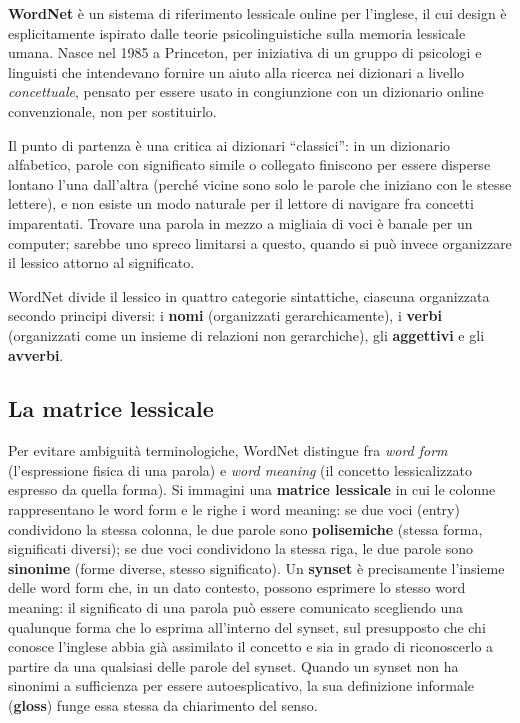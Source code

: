 \documentclass[11pt,a4paper]{report}
\begin{document}
\textbf{WordNet} è un sistema di riferimento lessicale online per l'inglese, il cui design è esplicitamente ispirato dalle teorie psicolinguistiche sulla memoria lessicale umana. Nasce nel 1985 a Princeton, per iniziativa di un gruppo di psicologi e linguisti che intendevano fornire un aiuto alla ricerca nei dizionari a livello \emph{concettuale}, pensato per essere usato in congiunzione con un dizionario online convenzionale, non per sostituirlo.

Il punto di partenza è una critica ai dizionari ``classici'': in un dizionario alfabetico, parole con significato simile o collegato finiscono per essere disperse lontano l'una dall'altra (perché vicine sono solo le parole che iniziano con le stesse lettere), e non esiste un modo naturale per il lettore di navigare fra concetti imparentati. Trovare una parola in mezzo a migliaia di voci è banale per un computer; sarebbe uno spreco limitarsi a questo, quando si può invece organizzare il lessico attorno al significato.

WordNet divide il lessico in quattro categorie sintattiche, ciascuna organizzata secondo principi diversi: i \textbf{nomi} (organizzati gerarchicamente), i \textbf{verbi} (organizzati come un insieme di relazioni non gerarchiche), gli \textbf{aggettivi} e gli \textbf{avverbi}.

\subsection{La matrice lessicale}

Per evitare ambiguità terminologiche, WordNet distingue fra \emph{word form} (l'espressione fisica di una parola) e \emph{word meaning} (il concetto lessicalizzato espresso da quella forma). Si immagini una \textbf{matrice lessicale} in cui le colonne rappresentano le word form e le righe i word meaning: se due voci (entry) condividono la stessa colonna, le due parole sono \textbf{polisemiche} (stessa forma, significati diversi); se due voci condividono la stessa riga, le due parole sono \textbf{sinonime} (forme diverse, stesso significato). Un \textbf{synset} è precisamente l'insieme delle word form che, in un dato contesto, possono esprimere lo stesso word meaning: il significato di una parola può essere comunicato scegliendo una qualunque forma che lo esprima all'interno del synset, sul presupposto che chi conosce l'inglese abbia già assimilato il concetto e sia in grado di riconoscerlo a partire da una qualsiasi delle parole del synset. Quando un synset non ha sinonimi a sufficienza per essere autoesplicativo, la sua definizione informale (\textbf{gloss}) funge essa stessa da chiarimento del senso.
\end{document}
